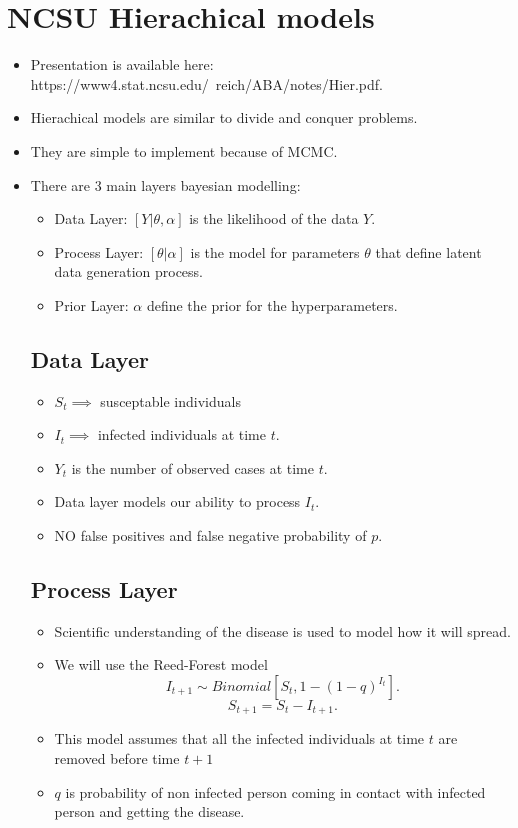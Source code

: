 \documentclass{article}
\begin{document}
\section{NCSU Hierachical models}
\begin{itemize}
    \item Presentation is available here: https://www4.stat.ncsu.edu/~reich/ABA/notes/Hier.pdf.
    \item Hierachical models are similar to divide and conquer problems. 
    \item They are simple to implement because of MCMC.
    \item There are 3 main layers bayesian modelling:
        \begin{itemize}
            \item Data Layer: $[Y| \theta, \alpha]$ is the likelihood of the data $Y$.
            \item Process Layer: $[\theta | \alpha]$ is the model for parameters $\theta$ that define latent data generation process.
            \item Prior Layer: $\alpha$ define the prior for the hyperparameters.
        \end{itemize}
        \subsection{Data Layer}
        \begin{itemize}
            \item $S_{t} \implies$ susceptable individuals
            \item $I_{t} \implies$ infected individuals at time $t$.
            \item $Y_{t}$ is the number of observed cases at time $t$.
            \item Data layer models our ability to process $I_{t}$.
            \item NO false positives and false negative probability of $p$.
        \end{itemize}
        \subsection{Process Layer}
        \begin{itemize}
            \item Scientific understanding of the disease is used to model how it will spread.
            \item We will use the Reed-Forest model
                \[
                    I_{t+1} \sim Binomial[S_{t}, 1 - (1 - q)^{I_{t}}] 
                .\] 
                \[
                    S_{t+1} = S_{t} - I_{t+1}
                .\]  
            \item This model assumes that all the infected individuals at time $t$ are removed before time $t+1$
            \item $q$ is probability of non infected person coming in contact with infected person and getting the disease.
        \end{itemize}

\end{itemize}
\end{document}

